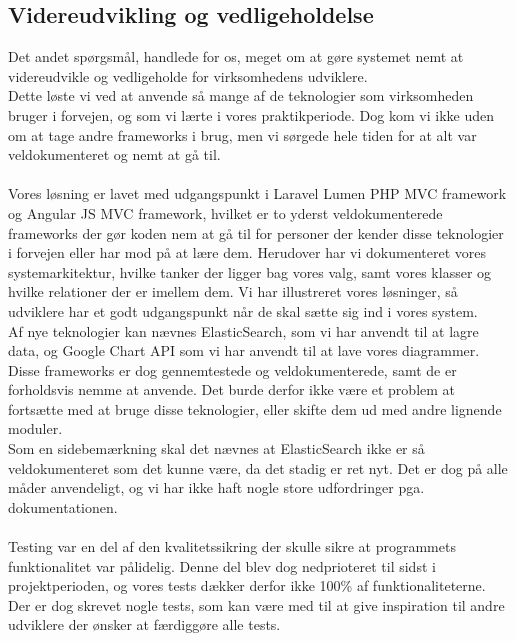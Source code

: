 \subsection{Videreudvikling og vedligeholdelse}
Det andet spørgsmål, handlede for os, meget om at gøre systemet nemt at videreudvikle og vedligeholde for virksomhedens udviklere.
\\
Dette løste vi ved at anvende så mange af de teknologier som virksomheden bruger i forvejen, og som vi lærte i vores praktikperiode. Dog kom vi ikke uden om at tage andre frameworks i brug, men vi sørgede hele tiden for at alt var veldokumenteret og nemt at gå til. 
\\\\
Vores løsning er lavet med udgangspunkt i Laravel Lumen PHP MVC framework og Angular JS MVC framework, hvilket er to yderst
veldokumenterede frameworks der gør koden nem at gå til for personer der kender disse teknologier i forvejen eller har mod på at lære dem.
Herudover har vi dokumenteret vores systemarkitektur, hvilke tanker der ligger bag vores valg, samt vores klasser og hvilke relationer der er imellem dem.
Vi har illustreret vores løsninger, så udviklere har et godt udgangspunkt når de skal sætte sig ind i vores system.
\\
Af nye teknologier kan nævnes ElasticSearch, som vi har anvendt til at lagre data, og Google Chart API som vi har anvendt til at
lave vores diagrammer.
Disse frameworks er dog gennemtestede og veldokumenterede, samt de er forholdsvis nemme at anvende.
Det burde derfor ikke være et problem at fortsætte med at bruge disse teknologier, eller skifte dem ud med andre lignende moduler.
\\
Som en sidebemærkning skal det nævnes at ElasticSearch ikke er så veldokumenteret som det kunne være, da det stadig er ret nyt.
Det er dog på alle måder anvendeligt, og vi har ikke haft nogle store udfordringer pga. dokumentationen.
\\\\
Testing var en del af den kvalitetssikring der skulle sikre at programmets funktionalitet var pålidelig.
Denne del blev dog nedprioteret til sidst i projektperioden, og vores tests dækker derfor ikke 100\% af funktionaliteterne.
Der er dog skrevet nogle tests, som kan være med til at give inspiration til andre udviklere der ønsker at færdiggøre alle tests.
